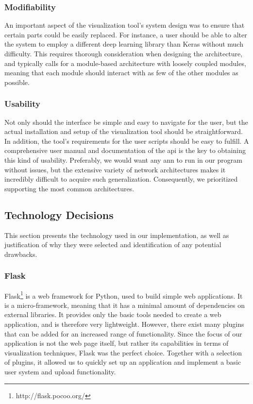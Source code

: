 \subsubsection{Modifiability}

An important aspect of the visualization tool's system design was to ensure that certain parts could be easily replaced. For instance, a user should be able to alter the system to employ a different deep learning library than Keras without much difficulty. This requires thorough consideration when designing the architecture, and typically calls for a module-based architecture with loosely coupled modules, meaning that each module should interact with as few of the other modules as possible.

\subsubsection{Usability}

Not only should the interface be simple and easy to navigate for the user, but the actual installation and setup of the visualization tool should be straightforward. In addition, the tool's requirements for the user scripts should be easy to fulfill. A comprehensive user manual and documentation of the \acrshort{api} is the key to obtaining this kind of usability. Preferably, we would want any \acrshort{ann} to run in our program without issues, but the extensive variety of network architectures makes it incredibly difficult to acquire such generalization. Consequently, we prioritized supporting the most common architectures.

\subsection{Technology Decisions}

This section presents the technology used in our implementation, as well as justification of why they were selected and identification of any potential drawbacks.

\subsubsection{Flask}

Flask\footnote{http://flask.pocoo.org/} is a web framework for Python, used to build simple web applications. It is a micro-framework, meaning that it has a minimal amount of dependencies on external libraries. It provides only the basic tools needed to create a web application, and is therefore very lightweight. However, there exist many plugins that can be added for an increased range of functionality. Since the focus of our application is not the web page itself, but rather its capabilities in terms of visualization techniques, Flask was the perfect choice. Together with a selection of plugins, it allowed us to quickly set up an application and implement a basic user system and upload functionality.

